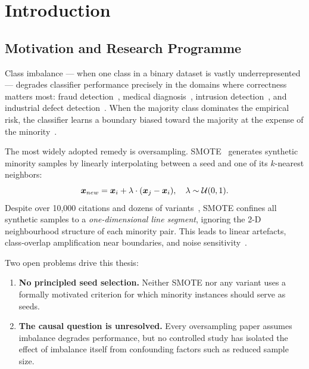 
\chapter{Introduction}
\label{ch:introduction}

\section{Motivation and Research Programme}
\label{sec:intro:motivation}

Class imbalance --- when one class in a binary dataset is vastly underrepresented --- degrades classifier performance precisely in the domains where correctness matters most: fraud detection~\cite{dal2014learned}, medical diagnosis~\cite{mazurowski2008training}, intrusion detection~\cite{tavallaee2009detailed}, and industrial defect detection~\cite{wang2016automatically}.
When the majority class dominates the empirical risk, the classifier learns a boundary biased toward the majority at the expense of the minority~\cite{japkowicz2002class, he2009learning}.

The most widely adopted remedy is oversampling.
SMOTE~\cite{chawla2002smote} generates synthetic minority samples by linearly interpolating between a seed and one of its $k$-nearest neighbors:
\begin{equation}
  \bm{x}_{new} = \bm{x}_i + \lambda \cdot (\bm{x}_j - \bm{x}_i), \quad \lambda \sim \mathcal{U}(0,1).
  \label{eq:smote}
\end{equation}
Despite over 10{,}000 citations and dozens of variants~\cite{fernandez2018smote}, SMOTE confines all synthetic samples to a \emph{one-dimensional line segment}, ignoring the 2-D neighbourhood structure of each minority pair.
This leads to linear artefacts, class-overlap amplification near boundaries, and noise sensitivity~\cite{han2005borderline, batista2004study}.

Two open problems drive this thesis:
\begin{enumerate}
  \item \textbf{No principled seed selection.} Neither SMOTE nor any variant uses a formally motivated criterion for which minority instances should serve as seeds.
  \item \textbf{The causal question is unresolved.} Every oversampling paper assumes imbalance degrades performance, but no controlled study has isolated the effect of imbalance itself from confounding factors such as reduced sample size.
\end{enumerate}

